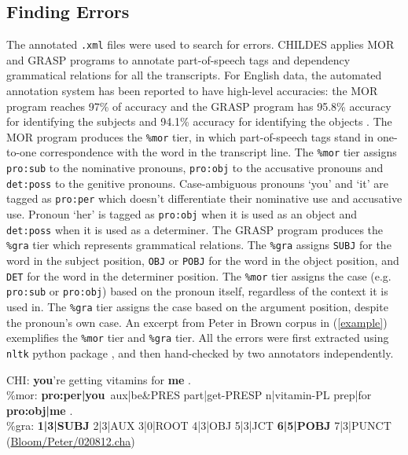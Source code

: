 \subsection{Finding Errors}
The annotated \texttt{.xml} files were used to search for errors. CHILDES applies MOR and GRASP programs to annotate part-of-speech tags and dependency grammatical relations for all the transcripts. For English data, the automated annotation system has been reported to have high-level accuracies: the MOR program reaches 97\% of accuracy and the GRASP program has 95.8\% accuracy for identifying the subjects and 94.1\% accuracy for identifying the objects \citep{macwhinney2012morphosyntactic,sagae2010morphosyntactic}. The MOR program produces the \texttt{\%mor} tier, in which part-of-speech tags stand in one-to-one correspondence with the word in the transcript line. The \texttt{\%mor} tier assigns \texttt{pro:sub} to the nominative pronouns, \texttt{pro:obj} to the accusative pronouns and \texttt{det:poss} to the genitive pronouns. Case-ambiguous pronouns `you' and `it' are tagged as \texttt{pro:per} which doesn't differentiate their nominative use and accusative use. Pronoun `her' is tagged as \texttt{pro:obj} when it is used as an object and \texttt{det:poss} when it is used as a determiner. The GRASP program produces the \texttt{\%gra} tier which represents grammatical relations. The \texttt{\%gra} assigns \texttt{SUBJ} for the word in the subject position,  \texttt{OBJ} or \texttt{POBJ} for the word in the object position, and \texttt{DET} for the word in the determiner position. The \texttt{\%mor} tier assigns the case (e.g. \texttt{pro:sub} or \texttt{pro:obj}) based on the pronoun itself, regardless of the context it is used in. The \texttt{\%gra} tier assigns the case based on the argument position, despite the pronoun's own case. An excerpt from Peter in Brown corpus in (\ref{example}) exemplifies the \texttt{\%mor} tier and \texttt{\%gra} tier. All the errors were first extracted using \texttt{nltk} python package \citep{bird2009natural}, and then hand-checked by two annotators independently. 
\begin{exe}
\ex \label{example} \gll *CHI: \textbf{you}'re getting vitamins for \textbf{me }.\\
\%mor:	\textbf{pro:per|you}~aux|be&PRES part|get-PRESP n|vitamin-PL prep|for \textbf{pro:obj|me} .\\
\%gra:\textbf{	1|3|SUBJ} 2|3|AUX 3|0|ROOT 4|3|OBJ 5|3|JCT \textbf{6|5|POBJ} 7|3|PUNCT\\
(\href{https://childes.talkbank.org/browser/index.php?url=Eng-NA/Bloom/Peter/020812.cha}{Bloom/Peter/020812.cha})
\end{exe}

